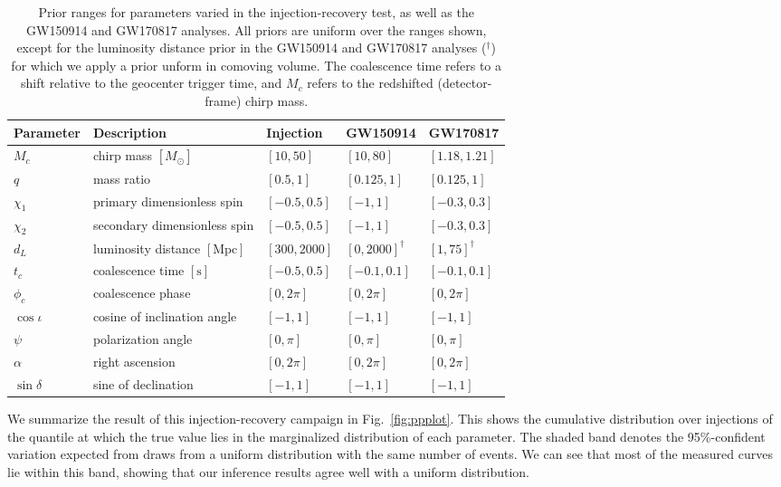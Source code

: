 \documentclass[twocolumn]{aastex631}
\begin{document}
\begin{table*}[hbt!]
    \begin{center}
    \begin{tabular}{ l l l l l }
    \hline
    \hline
    Parameter &  Description & Injection & GW150914 & GW170817\\
    \hline

    $M_c$ & chirp mass $[M_\odot]$& $[10, 50]$ & $[10,80]$ & $[1.18,1.21]$ \\
    $q$ & mass ratio & $[0.5, 1]$ & $[0.125,1]$ & $[0.125,1]$ \\
    $\chi_1$ & primary dimensionless spin& $[-0.5, 0.5]$ & $[-1,1]$ & $[-0.3,0.3]$ \\
    $\chi_2$ & secondary dimensionless spin & $[-0.5, 0.5]$ & $[-1,1]$ & $[-0.3,0.3]$ \\
    $d_L$ & luminosity distance $[\textrm{Mpc}]$ & $[300, 2000]$ & $[0, 2000]^\dag$ & $[1, 75]^\dag$ \\
    $t_c$ & coalescence time $[\textrm{s}]$& $[-0.5, 0.5]$ & $[-0.1, 0.1]$ & $[-0.1, 0.1]$ \\
    $\phi_c$ & coalescence phase & $[0, 2\pi]$ & $[0, 2\pi]$ & $[0, 2\pi]$ \\
    $\cos{\iota}$ & cosine of inclination angle & $[-1, 1]$ & $[-1, 1]$ & $[-1, 1]$ \\
    $\psi$ & polarization angle & $[0, \pi]$ & $[0, \pi]$ & $[0, \pi]$ \\
    $\alpha$ & right ascension & $[0, 2\pi]$ & $[0, 2\pi]$ & $[0, 2\pi]$ \\
    $\sin{\delta}$ & sine of declination & $[-1, 1]$ & $[-1, 1]$ & $[-1, 1]$ \\

    \hline
    \hline
    \end{tabular}
    \caption{Prior ranges for parameters varied in the injection-recovery test,
    as well as the GW150914 and GW170817 analyses. All priors are uniform over
    the ranges shown, except for the luminosity distance prior in the GW150914
    and GW170817 analyses ($^\dag$) for which we apply a prior unform in
    comoving volume. The coalescence time refers to a shift relative to the
    geocenter trigger time, and $M_c$ refers to the redshifted (detector-frame)
    chirp mass.}
    \label{tab:parameters}
    \end{center}
\end{table*}

We summarize the result of this injection-recovery campaign in
Fig.~\ref{fig:ppplot}. This shows the cumulative distribution over injections
of the quantile at which the true value lies in the marginalized distribution
of each parameter. The shaded band denotes the 95\%-confident variation
expected from draws from a uniform distribution with the same number of events.
We can see that most of the measured curves lie within this band, showing that
our inference results agree well with a uniform distribution.
\end{document}
